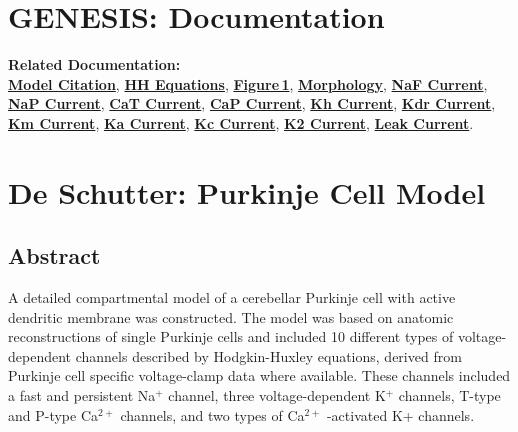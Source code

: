 \documentclass[12pt]{article}
\begin{document}
\section*{GENESIS: Documentation}

{\bf Related Documentation:}\\
\href{pub-purkinje-deschutter1-citation/pub-purkinje-deschutter1-citation.tex}{\bf Model Citation}, 
\href{pub-purkinje-deschutter1-equations1/pub-purkinje-deschutter1-equations1.tex}{\bf HH Equations},
\href{pub-purkinje-deschutter1-fig-1/pub-purkinje-deschutter1-fig-1.tex}{\bf Figure\,1},
\href{pub-purkinje-deschutter1-morphology/pub-purkinje-deschutter1-morphology.tex}{\bf Morphology},
\href{pub-purkinje-deschutter1-conductance1-naf1/pub-purkinje-deschutter1-conductance1-naf1.tex}{\bf NaF Current},
\href{pub-purkinje-deschutter1-conductance1-nap1/pub-purkinje-deschutter1-conductance1-nap1.tex}{\bf NaP Current},
\href{pub-purkinje-deschutter1-conductance1-cat1/pub-purkinje-deschutter1-conductance1-cat1.tex}{\bf CaT Current},
\href{pub-purkinje-deschutter1-conductance1-cap1/pub-purkinje-deschutter1-conductance1-cap1.tex}{\bf CaP Current},
\href{pub-purkinje-deschutter1-conductance1-kh1/pub-purkinje-deschutter1-conductance1-kh1.tex}{\bf Kh Current},
\href{pub-purkinje-deschutter1-conductance1-kdr1/pub-purkinje-deschutter1-conductance1-kdr1.tex}{\bf Kdr Current},
\href{pub-purkinje-deschutter1-conductance1-km1/pub-purkinje-deschutter1-conductance1-km1.tex}{\bf Km Current},
\href{pub-purkinje-deschutter1-conductance1-ka1/pub-purkinje-deschutter1-conductance1-ka1.tex}{\bf Ka Current},
\href{pub-purkinje-deschutter1-conductance1-kc1/pub-purkinje-deschutter1-conductance1-kc1.tex}{\bf Kc Current},
\href{pub-purkinje-deschutter1-conductance1-k2/pub-purkinje-deschutter1-conductance1-k2.tex}{\bf K2 Current},
\href{pub-purkinje-deschutter1-conductance1-leak1/pub-purkinje-deschutter1-conductance1-leak1.tex}{\bf Leak Current}.

\section*{De Schutter: Purkinje Cell Model}

\subsection*{Abstract}

A detailed compartmental model of a cerebellar Purkinje
cell with active dendritic membrane was constructed. The model
was based on anatomic reconstructions of single Purkinje cells and
included 10 different types of voltage-dependent channels described
by Hodgkin-Huxley equations, derived from Purkinje cell specific
voltage-clamp data where available. These channels included
a fast and persistent Na$^+$ channel, three voltage-dependent
K$^+$ channels, T-type and P-type Ca$^{2+}$ channels, and two types of
Ca$^{2+}$ -activated K+ channels.
\end{document}

